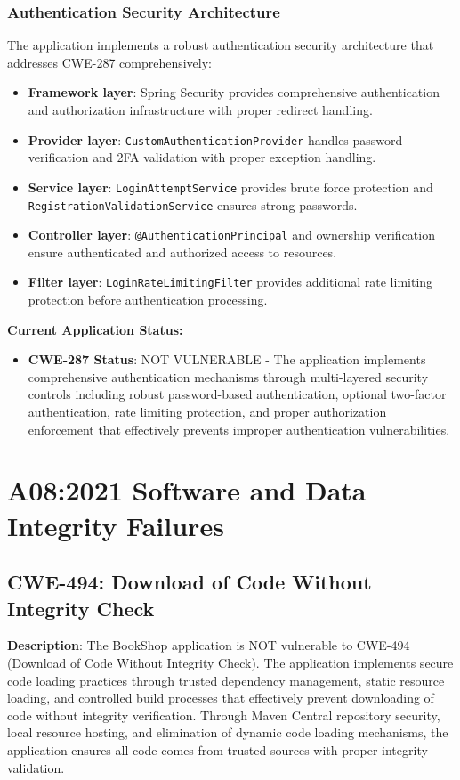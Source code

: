 \documentclass[]{UCD_CS_FYP_Report}
\begin{document}
\subsection{Authentication Security Architecture}
The application implements a robust authentication security architecture that addresses CWE-287 comprehensively:
\begin{itemize}
	\item \textbf{Framework layer}: Spring Security provides comprehensive authentication and authorization infrastructure with proper redirect handling.
	\item \textbf{Provider layer}: \texttt{CustomAuthenticationProvider} handles password verification and 2FA validation with proper exception handling.
	\item \textbf{Service layer}: \texttt{LoginAttemptService} provides brute force protection and \texttt{RegistrationValidationService} ensures strong passwords.
	\item \textbf{Controller layer}: \texttt{@AuthenticationPrincipal} and ownership verification ensure authenticated and authorized access to resources.
	\item \textbf{Filter layer}: \texttt{LoginRateLimitingFilter} provides additional rate limiting protection before authentication processing.
\end{itemize}

\textbf{Current Application Status:}
\begin{itemize}
	\item \textbf{CWE-287 Status}: NOT VULNERABLE - The application implements comprehensive authentication mechanisms through multi-layered security controls including robust password-based authentication, optional two-factor authentication, rate limiting protection, and proper authorization enforcement that effectively prevents improper authentication vulnerabilities.
\end{itemize}


\chapter{A08:2021 Software and Data Integrity Failures}

\section{CWE-494: Download of Code Without Integrity Check}

\textbf{Description}: The BookShop application is NOT vulnerable to CWE-494 (Download of Code Without Integrity Check). The application implements secure code loading practices through trusted dependency management, static resource loading, and controlled build processes that effectively prevent downloading of code without integrity verification. Through Maven Central repository security, local resource hosting, and elimination of dynamic code loading mechanisms, the application ensures all code comes from trusted sources with proper integrity validation.
\end{document}
